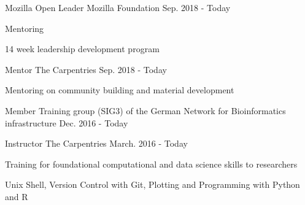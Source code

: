 

\begin{cventries}

  \cventry
    {Mozilla Open Leader} %
    {Mozilla Foundation} %
    {} %
    {Sep. 2018 - Today} %
    {
      \begin{cvitems} %
        \item {Mentoring}
        \item {14 week leadership development program}
      \end{cvitems}
    }

  \cventry
    {Mentor} %
    {The Carpentries} %
    {} %
    {Sep. 2018 - Today} %
    {
      \begin{cvitems} %
        \item {Mentoring on community building and material development}
      \end{cvitems}
    }

  \cventry
    {Member} %
    {Training group (SIG3) of the German Network for Bioinformatics infrastructure} %
    {} %
    {Dec. 2016 - Today} %
    {}

  \cventry
    {Instructor} %
    {The Carpentries} %
    {} %
    {March. 2016 - Today} %
    {
      \begin{cvitems} %
        \item {Training for foundational computational and data science skills to researchers}
        \item {Unix Shell, Version Control with Git, Plotting and Programming with Python and R}
      \end{cvitems}
    }



\end{cventries}

